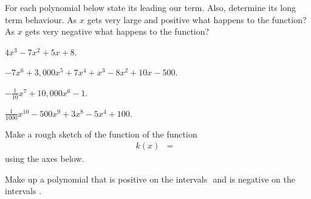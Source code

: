 \begin{problem}
\item For each polynomial below state its leading our term.  Also,
  determine its long term behaviour. As $x$ gets very large and
  positive what happens to the function? As $x$ gets very negative
  what happens to the function?
  \begin{subproblem}
  \item ${\displaystyle 4x^3 - 7x^2 + 5x + 8 }$.
    \vfill
  \item ${\displaystyle -7 x^6 + 3,000 x^5 + 7x^4 + x^3 - 8x^2 + 10x - 500}$.
    \vfill
  \item ${\displaystyle - \frac{1}{10} x^7 + 10,000 x^6 - 1 }$.
    \vfill
  \item ${\displaystyle \frac{1}{1000} x^{10} - 500 x^9 + 3 x^8 - 5 x^4 + 100 }$.
    \vfill
  \end{subproblem}

  \clearpage

\item Make a rough sketch of the function of the function
  \begin{eqnarray*}
    k(x) & = & 
  \end{eqnarray*}
  using the axes below.


  \vfill

  \clearpage
  
  \item Make up a polynomial that is positive on the intervals $ $ and
    is negative on the intervals $ $.


\end{problem}
